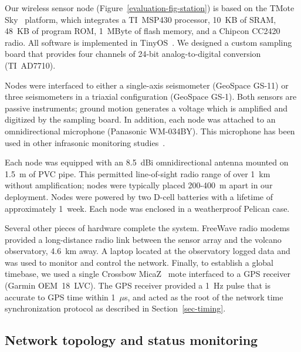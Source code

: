 Our wireless sensor node (Figure~\ref{evaluation-fig-station})
is based on the TMote Sky~\cite{moteiv} 
platform, which integrates a TI~MSP430 processor, 10~KB of SRAM,
48~KB of program ROM, 1~MByte of flash memory, and a Chipcon 
CC2420 radio. All software is implemented in TinyOS~\cite{tinyos-asplos00}.
We designed a custom sampling board that 
provides four channels of 24-bit analog-to-digital 
conversion (TI~AD7710). 

Nodes were interfaced to either a single-axis seismometer
(GeoSpace GS-11) or three seismometers in 
a triaxial configuration (GeoSpace GS-1). 
Both sensors are
passive instruments; ground motion generates a voltage which is 
amplified and digitized by the sampling board. 
In addition, each node was attached to an
omnidirectional microphone (Panasonic WM-034BY). This microphone has
been used in other infrasonic monitoring studies~\cite{johnson-etal-04b}.

Each node was equipped with an 8.5~dBi omnidirectional antenna 
mounted on 1.5~m of PVC pipe. 
This permitted line-of-sight radio range of over 1~km 
without amplification; nodes were typically placed 200-400~m apart 
in our deployment. Nodes were powered by two D-cell batteries with 
a lifetime of approximately 1~week.  
Each node was enclosed in a weatherproof Pelican case.

Several other pieces of hardware complete the system. FreeWave radio 
modems provided a long-distance radio link between the
sensor array and the volcano observatory, 4.6~km away. A laptop 
located at the observatory logged data and was used to
monitor and control the network.  Finally, to establish
a global timebase, we used a single Crossbow MicaZ~\cite{xbow} mote
interfaced to a GPS receiver (Garmin OEM~18~LVC).  The GPS receiver
provided a 1~Hz pulse that is accurate to GPS time within 1~$\mu$s,
and acted as the root of the network time synchronization protocol as
described in Section~\ref{sec-timing}.

\subsection{Network topology and status monitoring}

